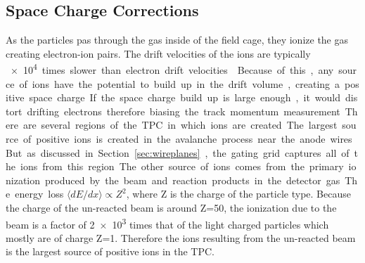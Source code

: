 
\subsection{Space Charge Corrections}
\label{sec:spacecharge}


As the particles pas through the gas inside of the field cage, they ionize the gas creating electron-ion pairs. The drift velocities of the ions are typically \SI{e4} times slower than electron drift velocities \cite{blumrol}. Because of this, any source of ions have the potential to build up in the drift volume, creating a positive space charge. If the space charge build up is large enough, it would distort drifting electrons therefore biasing the track momentum measurement. There are several regions of the TPC in which ions are created. The largest source of positive ions is created in the avalanche process near the anode wires. But as discussed in Section~\ref{sec:wireplanes}, the gating grid captures all of the ions from this region. The other source of ions comes from the primary ionization produced by the beam and reaction products in the detector gas. The energy loss  $\langle dE/dx\rangle \propto Z^2$, where Z is the charge of the particle type. Because the charge of the un-reacted beam is around Z=50, the ionization due to the beam is a factor of \num{2e3} times that of the light charged particles which mostly are of charge Z=1. Therefore the ions resulting from the un-reacted beam is the largest source of positive ions in the TPC. 


 
 \begin{comment}
 
 \begin{table}[!htb] %
\centering %
\begin{tabular}{
  @{}
  l
  S[table-format=1.2]
  S[table-format=1.2]
  S[table-format=1.2]
  S[table-format=5.2]
  S[table-format=5.2]
  @{}
}
\toprule
Beam Energy Loss  &
 {${}^{132}$Sn} &
 {${}^{124}$Sn} &
 {${}^{112}$Sn} &
 {${}^{108}$Sn} &
  {Avg.}\\
  
\midrule
$\si{\kilo\eV\per\centi\meter}$ & 11.2   &.034  &5.43   &  903   &150     \\
\bottomrule
\end{tabular}

\caption{Average energy loss of each beam.}
\label{tb:beameloss}
\end{table}
\end{comment}


